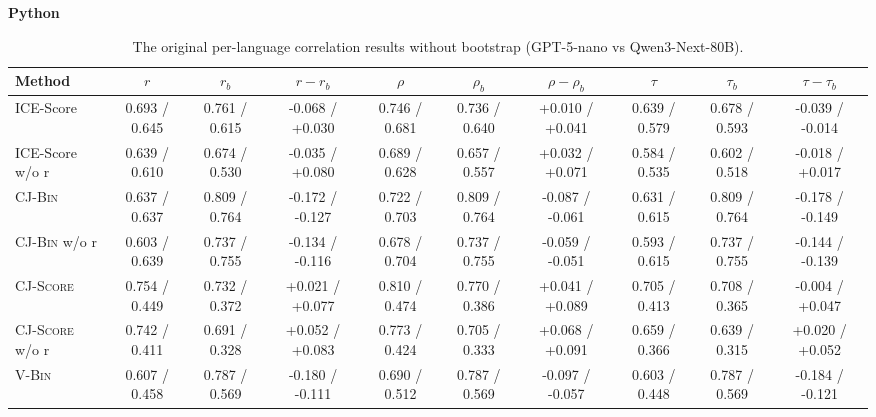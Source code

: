 \begin{table}[t]
    \centering
    \scriptsize
    \setlength{\tabcolsep}{3.5pt}
    \caption{The original per-language correlation results without bootstrap (GPT-5-nano vs Qwen3-Next-80B).}
    \label{tab:per-language}
    {\bf Python}\\
    \begin{tabular}{@{}l|ccc|ccc|ccc@{}}
        \toprule
        Method & $r$ & $r_b$ & $r-r_b$ & $\rho$ & $\rho_b$ & $\rho-\rho_b$ & $\tau$ & $\tau_b$ & $\tau-\tau_b$ \\
        \midrule
        ICE-Score               & 0.693 / 0.645   & 0.761 / 0.615   & -0.068 / +0.030                     & 0.746 / 0.681   & 0.736 / 0.640   & +0.010 / +0.041                     & 0.639 / 0.579   & 0.678 / 0.593   & -0.039 / -0.014                     \\
        ICE-Score w/o r         & 0.639 / 0.610   & 0.674 / 0.530   & -0.035 / +0.080                     & 0.689 / 0.628   & 0.657 / 0.557   & +0.032 / +0.071                     & 0.584 / 0.535   & 0.602 / 0.518   & -0.018 / +0.017                     \\
        \midrule
        \textsc{CJ-Bin}         & 0.637 / 0.637   & 0.809 / 0.764   & -0.172 / -0.127                     & 0.722 / 0.703   & 0.809 / 0.764   & -0.087 / -0.061                     & 0.631 / 0.615   & 0.809 / 0.764   & -0.178 / -0.149                     \\
        \textsc{CJ-Bin} w/o r   & 0.603 / 0.639   & 0.737 / 0.755   & -0.134 / -0.116                     & 0.678 / 0.704   & 0.737 / 0.755   & -0.059 / -0.051                     & 0.593 / 0.615   & 0.737 / 0.755   & -0.144 / -0.139                     \\
        \textsc{CJ-Score}       & 0.754 / 0.449   & 0.732 / 0.372   & +0.021 / +0.077                     & 0.810 / 0.474   & 0.770 / 0.386   & +0.041 / +0.089                     & 0.705 / 0.413   & 0.708 / 0.365   & -0.004 / +0.047                     \\
        \textsc{CJ-Score} w/o r & 0.742 / 0.411   & 0.691 / 0.328   & +0.052 / +0.083                     & 0.773 / 0.424   & 0.705 / 0.333   & +0.068 / +0.091                     & 0.659 / 0.366   & 0.639 / 0.315   & +0.020 / +0.052                     \\
        \midrule
        \textsc{V-Bin}          & 0.607 / 0.458   & 0.787 / 0.569   & -0.180 / -0.111                     & 0.690 / 0.512   & 0.787 / 0.569   & -0.097 / -0.057                     & 0.603 / 0.448   & 0.787 / 0.569   & -0.184 / -0.121                     \\

\end{tabular}
\end{table}
